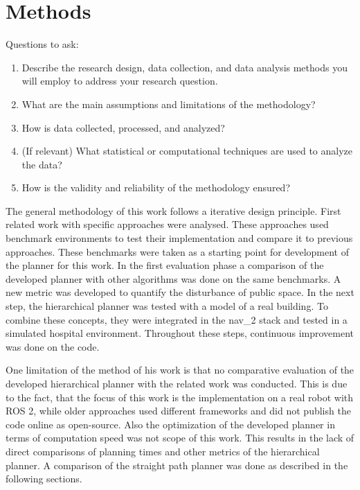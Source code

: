 \chapter{Methods}
\label{sec:methods}
Questions to ask:
\begin{enumerate}
    \item Describe the research design, data collection, and data analysis methods you will employ to address your research question.
    \item What are the main assumptions and limitations of the methodology?
    \item How is data collected, processed, and analyzed? 
    \item (If relevant) What statistical or computational techniques are used to analyze the data?  
    \item How is the validity and reliability of the methodology ensured? 
\end{enumerate}

The general methodology of this work follows a iterative design principle. First related work with specific approaches were analysed. These approaches used benchmark environments to test their implementation and compare it to previous approaches. These benchmarks were taken as a starting point for development of the planner for this work. In the first evaluation phase a comparison of the developed planner with other algorithms was done on the same benchmarks. A new metric was developed to quantify the disturbance of public space. In the next step, the hierarchical planner was tested with a model of a real building. To combine these concepts, they were integrated in the \gls{nav_2} stack and tested in a simulated hospital environment. Throughout these steps, continuous improvement was done on the code.

One limitation of the method of his work is that no comparative evaluation of the developed hierarchical planner with the related work was conducted. This is due to the fact, that the focus of this work is the implementation on a real robot with ROS 2, while older approaches used different frameworks and did not publish the code online as open-source. Also the optimization of the developed planner in terms of computation speed was not scope of this work. This results in the lack of direct comparisons of planning times and other metrics of the hierarchical planner. A comparison of the straight path planner was done as described in the following sections.

